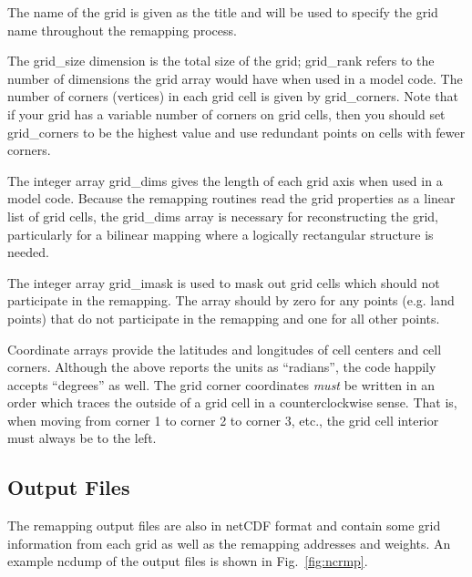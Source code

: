 \documentclass[12pt]{report}
\begin{document}
The name of the grid is given as the title and will be used
to specify the grid name throughout the remapping process.

The grid\_size dimension is the total size of the grid; grid\_rank
refers to the number of dimensions the grid array would have
when used in a model code.  The number of corners (vertices) in
each grid cell is given by grid\_corners.  Note that if your
grid has a variable number of corners on grid cells, then you
should set grid\_corners to be the highest value and use
redundant points on cells with fewer corners.

The integer array grid\_dims gives the length of each
grid axis when used in a model code.  Because the remapping
routines read the grid properties as a linear list of
grid cells, the grid\_dims array is necessary for
reconstructing the grid, particularly for a bilinear mapping
where a logically rectangular structure is needed.

The integer array grid\_imask is used to mask out grid cells
which should not participate in the remapping.  The array
should by zero for any points (e.g. land points) that do
not participate in the remapping and one for all other points.

Coordinate arrays provide the latitudes and longitudes of
cell centers and cell corners.  Although the above reports
the units as ``radians'', the code happily accepts ``degrees''
as well.  The grid corner coordinates {\em must} be
written in an order which traces the outside of a grid
cell in a counterclockwise sense.  That is, when moving
from corner 1 to corner 2 to corner 3, etc., the grid
cell interior must always be to the left.

\subsection{Output Files}

The remapping output files are also in netCDF format
and contain some grid information from each grid
as well as the remapping addresses and weights.  An example
ncdump of the output files is shown in Fig.~\ref{fig:ncrmp}.
\end{document}
